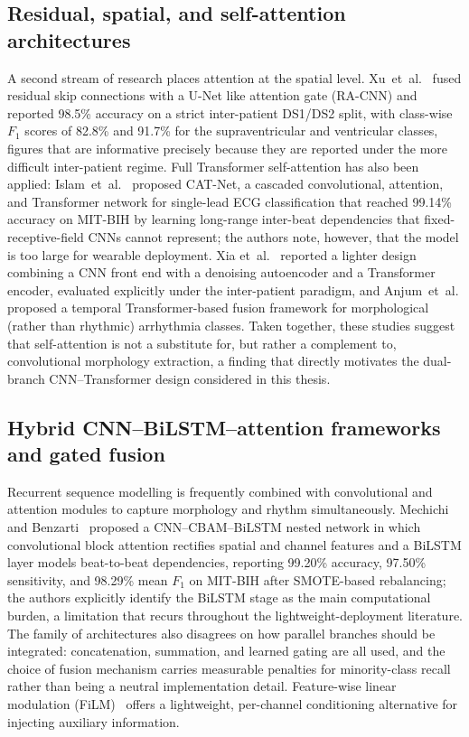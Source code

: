 \subsection{Residual, spatial, and self-attention architectures}

A second stream of research places attention at the spatial level.
Xu~et~al.~\cite{xu2022racnn} fused residual skip connections with a U-Net
like attention gate (RA-CNN) and reported 98.5\% accuracy on a strict
inter-patient DS1/DS2 split, with class-wise $F_1$ scores of 82.8\% and
91.7\% for the supraventricular and ventricular classes, figures that are
informative precisely because they are reported under the more difficult
inter-patient regime. Full Transformer self-attention has also been applied:
Islam~et~al.~\cite{islam2024} proposed CAT-Net, a cascaded convolutional,
attention, and Transformer network for single-lead ECG classification that
reached 99.14\% accuracy on MIT-BIH by learning long-range inter-beat
dependencies that fixed-receptive-field CNNs cannot represent; the authors
note, however, that the model is too large for wearable deployment. Xia
et~al.~\cite{xia2023transformer} reported a lighter design combining a CNN
front end with a denoising autoencoder and a Transformer encoder, evaluated
explicitly under the inter-patient paradigm, and Anjum~et~al.
\cite{anjum2023temporal} proposed a temporal Transformer-based fusion
framework for morphological (rather than rhythmic) arrhythmia classes.
Taken together, these studies suggest that self-attention is not a
substitute for, but rather a complement to, convolutional morphology
extraction, a finding that directly motivates the dual-branch
CNN--Transformer design considered in this thesis.

\subsection{Hybrid CNN--BiLSTM--attention frameworks and gated fusion}

Recurrent sequence modelling is frequently combined with convolutional and
attention modules to capture morphology and rhythm simultaneously. Mechichi
and Benzarti~\cite{mechichi2025enhanced} proposed a CNN--CBAM--BiLSTM
nested network in which convolutional block attention rectifies spatial and
channel features and a BiLSTM layer models beat-to-beat dependencies,
reporting 99.20\% accuracy, 97.50\% sensitivity, and 98.29\% mean $F_1$ on
MIT-BIH after SMOTE-based rebalancing; the authors explicitly identify the
BiLSTM stage as the main computational burden, a limitation that recurs
throughout the lightweight-deployment literature. The family of
architectures also disagrees on how parallel branches should be integrated:
concatenation, summation, and learned gating are all used, and the choice of
fusion mechanism carries measurable penalties for minority-class recall
rather than being a neutral implementation detail. Feature-wise linear
modulation (FiLM)~\cite{perez2018film} offers a lightweight, per-channel
conditioning alternative for injecting auxiliary information.

